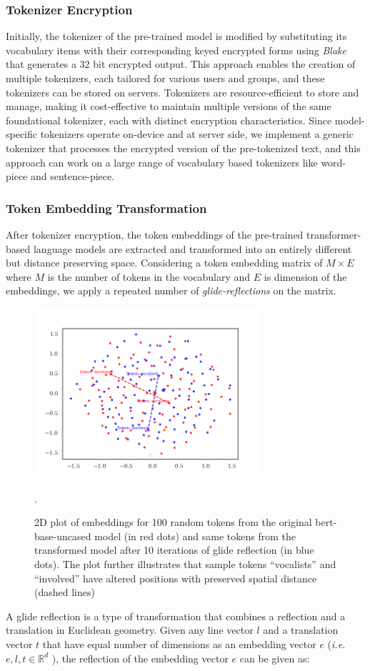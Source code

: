 \documentclass[letterpaper]{article} %
\begin{document}
\subsubsection{Tokenizer Encryption}
Initially, the tokenizer of the pre-trained model is modified by substituting its vocabulary items with their corresponding keyed encrypted forms using \textit{Blake} that generates a 32 bit encrypted output. This approach enables the creation of multiple tokenizers, each tailored for various users and groups, and these tokenizers can be stored on servers. Tokenizers are resource-efficient to store and manage, making it cost-effective to maintain multiple versions of the same foundational tokenizer, each with distinct encryption characteristics. Since model-specific tokenizers operate on-device and at server side, we implement a generic tokenizer that processes the encrypted version of the pre-tokenized text, and this approach can work on a large range of vocabulary based tokenizers like word-piece and sentence-piece.
\subsubsection{Token Embedding Transformation}
After tokenizer encryption, the token embeddings of the pre-trained transformer-based language models are extracted and transformed into an entirely different but distance preserving space. Considering a token embedding matrix of $M \times E$ where $M$ is the number of tokens in the vocabulary and $E$ is dimension of the embeddings, we apply a repeated number of \emph{glide-reflections} on the matrix.
\begin{figure}[t]
    \centering
    \includegraphics[width=8.4cm]{embedding_plot-2.png}
    \caption{2D plot of embeddings for 100 random tokens from the original bert-base-uncased model (in red dots) and same tokens from the transformed model after 10 iterations of glide reflection (in blue dots). The plot further illustrates that sample tokens ``vocalists'' and ``involved'' have altered positions with  preserved spatial distance (dashed lines)}.
    \label{fig:glide}
\end{figure}
A glide reflection is a type of transformation that combines a reflection and a translation in Euclidean geometry. Given any line vector $l$ and a translation vector $t$ that have equal number of dimensions as an embedding vector $e$ (\textit{i.e.} $e,l,t  \in \mathbb{R}^d$ ), the reflection of the embedding vector $e$ can be given as:
\end{document}
